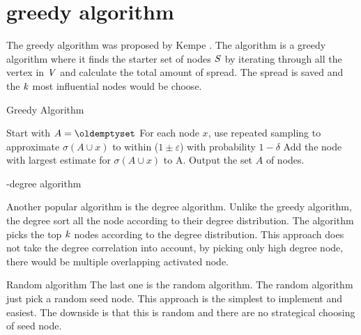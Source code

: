 \section{greedy algorithm}
The  greedy algorithm was proposed by Kempe \cite{MaximizeSpread2015}. The algorithm is a greedy algorithm where it finds the starter set of nodes $\it{S}$ by iterating through all the vertex in $\it{V}$ and calculate the total amount of spread. The spread is saved and the $\it{k}$ most influential nodes would be choose.

 \begin{algorithm}
\caption{Greedy Algorithm}
\begin{algorithmic}[1]
\State Start with $A = \oldemptyset$
\State For each node $x$, use repeated sampling to approximate $\sigma(A \cup {x}) $ to within ($1 \pm \varepsilon$) with probability
$1 − \delta$
\State Add the node with largest estimate for $\sigma(A \cup {x})$ to A.
\EndWhile
\State Output the set $A$ of nodes.
\end{algorithmic}
\end{algorithm}

-degree algorithm

Another popular algorithm is the degree algorithm\cite{MaximizeSpread2015}. Unlike the greedy algorithm, the degree sort all the node according to their degree distribution. The algorithm picks the top $\it{k}$ nodes according to the degree distribution. This approach does not take the degree correlation into account, by picking only high degree node, there would be multiple overlapping activated node.


Random algorithm
The last one is the random algorithm. The random algorithm just pick a random seed node. This approach is the simplest to implement and easiest. The downside is that this is random and there are no strategical choosing of seed node. 


